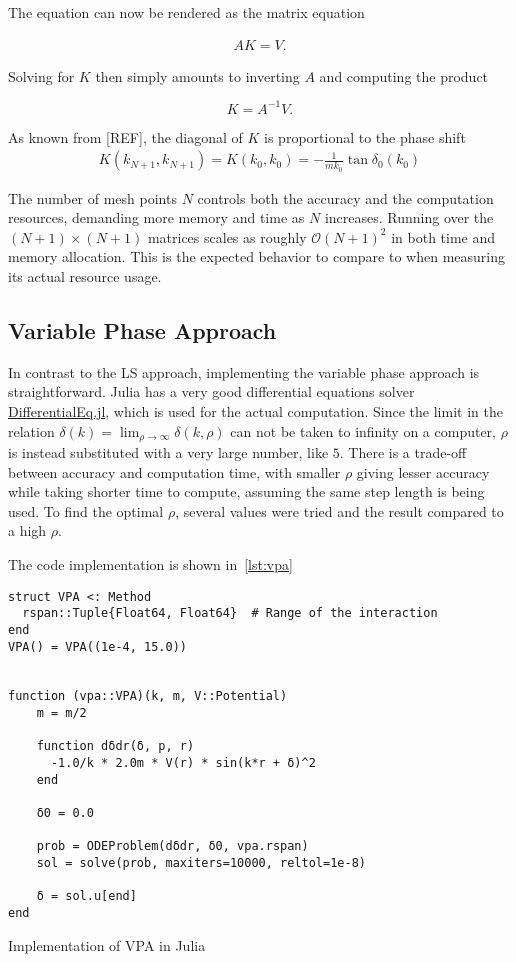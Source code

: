 The equation can now be rendered as the matrix equation

\begin{align*}
  AK = V.
\end{align*}

Solving for \(K\) then simply amounts to inverting \(A\) and computing the
product

\begin{equation}
  K = A^{-1}V.\label{eq:matrixeq}
\end{equation}

As known from [REF], the diagonal of \(K\) is proportional to the phase shift
\begin{align*}
  K(k_{N+1}, k_{N+1}) = K(k_{0}, k_{0}) = -\frac{1}{mk_{0}}\tan\delta_{0}(k_{0})
\end{align*}

The number of mesh points \(N\) controls both the accuracy and the computation
resources, demanding more memory and time as \(N\) increases. Running over the
\((N+1)\times (N+1)\) matrices scales as roughly \(\mathcal{O}(N+1)^{2}\) in
both time and memory allocation. This is the expected behavior to compare to
when measuring its actual resource usage.

\subsection{Variable Phase Approach}
In contrast to the LS approach, implementing the variable phase approach is
straightforward. Julia has a very good differential equations solver
\href{https://diffeq.sciml.ai/stable/#Getting-Started:-Installation-And-First-Steps}{DifferentialEq.jl}\cite{rackauckas2017differentialequations}, which is used for the actual computation.
Since the limit in the relation \(\delta(k) =
\lim_{\rho\to\infty}\delta(k, \rho)\) can not be taken to infinity on a computer, 
\(\rho\) is instead substituted with a very large number, like \(5\). There is a
trade-off between accuracy and computation time, with smaller \(\rho\) giving
lesser accuracy while taking shorter time to compute, assuming the same step
length is being used. To find the optimal \(\rho\), several values were tried
and the result compared to a high \(\rho\).

The code implementation is shown in~\cref{lst:vpa}

\begin{listing}
\begin{verbatim}
struct VPA <: Method
  rspan::Tuple{Float64, Float64}  # Range of the interaction
end
VPA() = VPA((1e-4, 15.0))


function (vpa::VPA)(k, m, V::Potential)
    m = m/2

    function dδdr(δ, p, r)
      -1.0/k * 2.0m * V(r) * sin(k*r + δ)^2
    end

    δ0 = 0.0

    prob = ODEProblem(dδdr, δ0, vpa.rspan)
    sol = solve(prob, maxiters=10000, reltol=1e-8)

    δ = sol.u[end]
end
  \end{verbatim}
  \caption{Implementation of VPA in Julia}
  \label{lst:vpa}
\end{listing}

